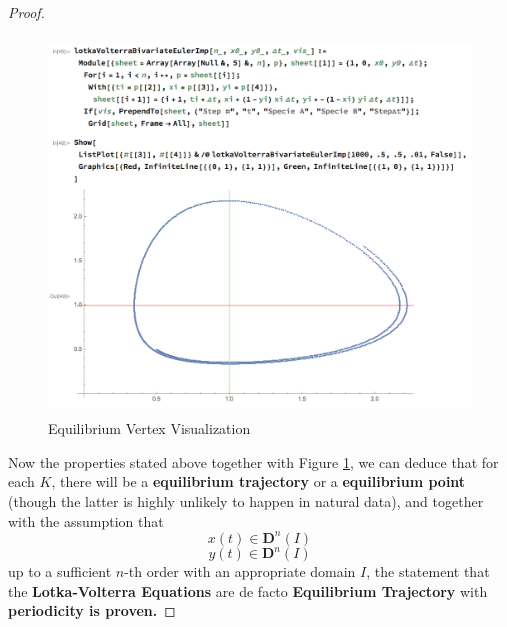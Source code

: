 \documentclass{article}
\begin{document}
\begin{proof}
\begin{figure}[!htbp]
    \centering
    \includegraphics[height=10cm]{Lotka-Volterra-Vertex.png}
    \caption{Equilibrium Vertex Visualization}
    \label{fig:lotka_volterra_vertex}
\end{figure}
Now the properties stated above together with Figure \ref{fig:lotka_volterra_vertex}, we can deduce that for each $K$, there will be a \textbf{equilibrium trajectory} or a \textbf{equilibrium point} (though the latter is highly unlikely to happen in natural data), and together with the assumption that
$$
x(t)\in\mathbf{D}^n(I)
$$
$$
y(t)\in\mathbf{D}^n(I)
$$
up to a sufficient $n$-th order with an appropriate domain $I$, the statement that the \textbf{Lotka-Volterra Equations} are de facto \textbf{Equilibrium Trajectory} with \textbf{periodicity is proven.}
\end{proof}
\end{document}
